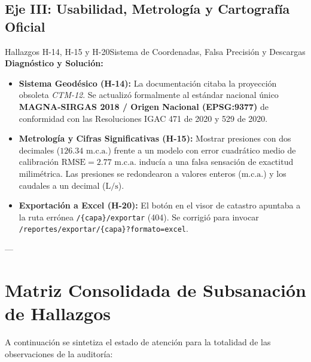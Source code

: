 \documentclass[11pt,letterpaper]{article}
\begin{document}
\subsection{Eje III: Usabilidad, Metrología y Cartografía Oficial}

\begin{hallazgobox}{Hallazgos H-14, H-15 y H-20}{Sistema de Coordenadas, Falsa Precisión y Descargas}
\textbf{Diagnóstico y Solución:}
\begin{itemize}
    \item \textbf{Sistema Geodésico (H-14):} La documentación citaba la proyección obsoleta \textit{CTM-12}. Se actualizó formalmente al estándar nacional único \textbf{MAGNA-SIRGAS 2018 / Origen Nacional (EPSG:9377)} de conformidad con las Resoluciones IGAC 471 de 2020 y 529 de 2020.
    \item \textbf{Metrología y Cifras Significativas (H-15):} Mostrar presiones con dos decimales ($126.34\text{ m.c.a.}$) frente a un modelo con error cuadrático medio de calibración $\text{RMSE} = 2.77\text{ m.c.a.}$ inducía a una falsa sensación de exactitud milimétrica. Las presiones se redondearon a valores enteros ($\text{m.c.a.}$) y los caudales a un decimal ($\text{L/s}$).
    \item \textbf{Exportación a Excel (H-20):} El botón en el visor de catastro apuntaba a la ruta errónea \texttt{/\{capa\}/exportar} (404). Se corrigió para invocar \texttt{/reportes/exportar/\{capa\}?formato=excel}.
\end{itemize}
\end{hallazgobox}

---

\section{Matriz Consolidada de Subsanación de Hallazgos}

A continuación se sintetiza el estado de atención para la totalidad de las observaciones de la auditoría:
\end{document}
